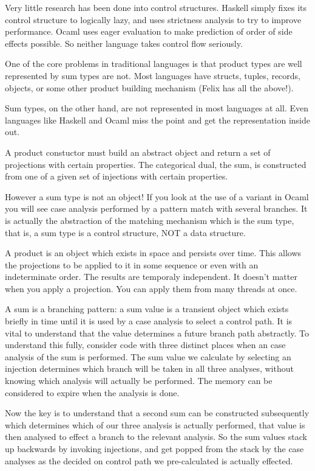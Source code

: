 \documentclass[oneside]{book}
\begin{document}
Very little research has been done into control structures.
Haskell simply fixes its control structure to logically
lazy, and uses strictness analysis to try to improve 
performance. Ocaml uses eager evaluation to make prediction
of order of side effects possible. So neither language takes
control flow seriously.

One of the core problems in traditional languages is that
product types are well represented by sum types are not.
Most languages have structs, tuples, records, objects, or some other
product building mechanism (Felix has all the above!).

Sum types, on the other hand, are not represented in most
languages at all. Even languages like Haskell and Ocaml
miss the point and get the representation inside out.

A product constuctor must build an abstract object
and return a set of projections with certain properties.
The categorical dual, the sum, is constructed from
one of a given set of injections with certain properties.

However a sum type is not an object! If you look at
the use of a variant in Ocaml you will see case analysis
performed by a pattern match with several branches.
It is actually the abstraction of the matching mechanism
which is the sum type, that is, a sum type is a control
structure, NOT a data structure.

A product is an object which exists in space and persists
over time. This allows the projections to be applied to it
in some sequence or even with an indeterminate order.
The results are temporaly independent. It doesn't matter when
you apply a projection. You can apply them from many threads
at once.

A sum is a branching pattern: a sum value is a transient
object which exists briefly in time until it is used
by a case analysis to select a control path. It is vital
to understand that the value determines a future branch
path abstractly. To understand this fully, consider code
with three distinct places when an case analysis of the sum
is performed. The sum value we calculate by selecting an
injection determines which branch will be taken in all
three analyses, without knowing which analysis will actually
be performed. The memory can be considered to expire when
the analysis is done.

Now the key is to understand that a second sum can be
constructed subsequently which determines which of our
three analysis is actually performed, that value is
then analysed to effect a branch to the relevant analysis.
So the sum values stack up backwards by invoking injections,
and get popped from the stack by the case analyses as the
decided on control path we pre-calculated is actually effected.
\end{document}
